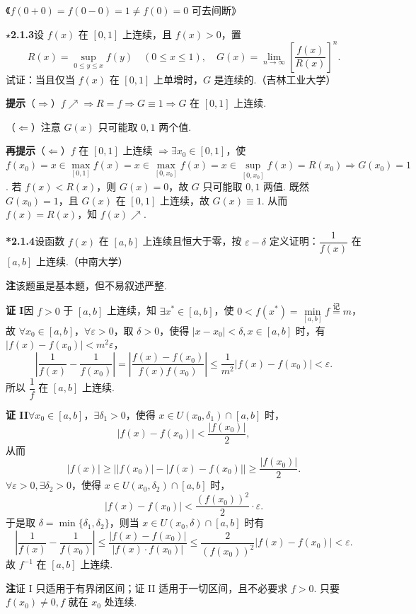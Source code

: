 \documentclass[UTF8,12pt,a4paper,fontset=fandol]{ctexart}
\begin{document}
《$f(0+0)=f(0-0)=1\ne f(0)=0$ 可去间断》

\noindent\textbf{$\star$2.1.3}\quad 设 $f(x)$ 在 $[0,1]$ 上连续，且 $f(x)>0$，置
\[
  R(x)=\sup_{0\le y\le x}f(y)\quad(0\le x\le1),\quad
  G(x)=\lim_{n\to\infty}\left[\frac{f(x)}{R(x)}\right]^n.
\]
试证：当且仅当 $f(x)$ 在 $[0,1]$ 上单增时，$G$ 是连续的.（吉林工业大学）

\noindent\textbf{提示}\quad （$\Rightarrow$）$f\nearrow\Rightarrow R=f\Rightarrow G\equiv1\Rightarrow G$ 在 $[0,1]$ 上连续.

（$\Leftarrow$）注意 $G(x)$ 只可能取 $0,1$ 两个值.

\noindent\textbf{再提示}\quad （$\Leftarrow$）$f$ 在 $[0,1]$ 上连续 $\Rightarrow \exists x_0\in[0,1]$，使 $f(x_0)=x\in\max\limits_{[0,1]}f(x)=x\in\max\limits_{[0,x_0]}f(x)=x\in\sup\limits_{[0,x_0]}f(x)=R(x_0)\Rightarrow G(x_0)=1$. 若 $f(x)<R(x)$，则 $G(x)=0$，故 $G$ 只可能取 $0,1$ 两值. 既然 $G(x_0)=1$，且 $G(x)$ 在 $[0,1]$ 上连续，故 $G(x)\equiv1$. 从而 $f(x)=R(x)$，知 $f(x)\nearrow$.

\noindent\textbf{*2.1.4}\quad 设函数 $f(x)$ 在 $[a,b]$ 上连续且恒大于零，按 $\varepsilon-\delta$ 定义证明：$\dfrac1{f(x)}$ 在 $[a,b]$ 上连续.（中南大学）

\noindent\textbf{注}\quad 该题虽是基本题，但不易叙述严整.

\noindent\textbf{证 I}\quad 因 $f>0$ 于 $[a,b]$ 上连续，知 $\exists x^*\in[a,b]$，使 $0<f(x^*)=\min\limits_{[a,b]}f\overset{\text{记}}=m$，故 $\forall x_0\in[a,b]$，$\forall\varepsilon>0$，取 $\delta>0$，使得 $|x-x_0|<\delta,x\in[a,b]$ 时，有 $|f(x)-f(x_0)|<m^2\varepsilon$，
\[
  \left|\frac1{f(x)}-\frac1{f(x_0)}\right|
  =\left|\frac{f(x)-f(x_0)}{f(x)f(x_0)}\right|
  \le\frac1{m^2}|f(x)-f(x_0)|<\varepsilon.
\]
所以 $\dfrac1f$ 在 $[a,b]$ 上连续.

\noindent\textbf{证 II}\quad $\forall x_0\in[a,b]$，$\exists\delta_1>0$，使得 $x\in U(x_0,\delta_1)\cap[a,b]$ 时，
\[
  |f(x)-f(x_0)|<\frac{|f(x_0)|}{2},
\]
从而
\[
  |f(x)|\ge\bigl||f(x_0)|-|f(x)-f(x_0)|\bigr|\ge \frac{|f(x_0)|}{2}.
\]
$\forall\varepsilon>0,\exists\delta_2>0$，使得 $x\in U(x_0,\delta_2)\cap[a,b]$ 时，
\[
  |f(x)-f(x_0)|<\frac{(f(x_0))^2}{2}\cdot\varepsilon.
\]
于是取 $\delta=\min\{\delta_1,\delta_2\}$，则当 $x\in U(x_0,\delta)\cap[a,b]$ 时有
\[
  \left|\frac1{f(x)}-\frac1{f(x_0)}\right|
  \le\frac{|f(x)-f(x_0)|}{|f(x)\cdot f(x_0)|}
  \le\frac2{(f(x_0))^2}|f(x)-f(x_0)|<\varepsilon.
\]
故 $f^{-1}$ 在 $[a,b]$ 上连续.

\noindent\textbf{注}\quad 证 I 只适用于有界闭区间；证 II 适用于一切区间，且不必要求 $f>0$. 只要 $f(x_0)\ne0,f$ 就在 $x_0$ 处连续.
\end{document}
